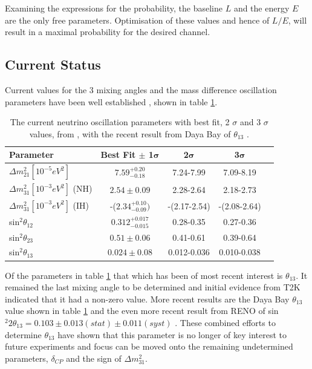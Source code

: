 Examining the expressions for the probability, the baseline $L$ and the energy $E$ are the only free parameters. Optimisation of these values and hence of $L/E$, will result in a maximal probability for the desired channel.

\subsection{Current Status}
Current values for the 3 mixing angles and the mass difference oscillation parameters have been well established \cite{oscParameters}\cite{DayaBaytheta13}, shown in table \ref{tab:osciParameterTable}.
\renewcommand{\arraystretch}{1.5}
\begin{table}[htpb]
\begin{center}
  \begin{tabular}{l*{3}{c}r}
  \hline
  \textbf{Parameter} & \textbf{Best Fit} $\boldsymbol{\pm}$ 1$\boldsymbol{\sigma}$ & \textbf{2}$\boldsymbol{\sigma}$ & \textbf{3}$\boldsymbol{\sigma}$ \\
    \hline
\hline
$\Delta m^{2}_{21} [10^{-5}eV^{2}]$ & $7.59^{+0.20}_{-0.18} $ & 7.24-7.99 & 7.09-8.19\\
$\Delta m^{2}_{31} [10^{-3}eV^{2}]$ (NH) & $2.54 \pm 0.09 $ & 2.28-2.64 & 2.18-2.73\\
$\Delta m^{2}_{31} [10^{-3}eV^{2}]$ (IH) & -($2.34^{+0.10}_{-0.09}) $ & -(2.17-2.54) & -(2.08-2.64)\\
sin$^{2}\theta_{12}$ & $0.312^{+0.017}_{-0.015} $ & 0.28-0.35 & 0.27-0.36\\
sin$^{2}\theta_{23}$ & $0.51 \pm 0.06 $ & 0.41-0.61 & 0.39-0.64\\
sin$^{2}\theta_{13}$ & $0.024 \pm 0.08 $  &  0.012-0.036 & 0.010-0.038\\
    \hline
  \end{tabular}
      \caption{The current neutrino oscillation parameters with best fit, 2 $\sigma$ and 3 $\sigma$ values, from \cite{oscParameters}, with the recent result from Daya Bay of $\theta_{13}$ \cite{DayaBaytheta13}.}
    \label{tab:osciParameterTable}
\end{center}
    \end{table}
\renewcommand{\arraystretch}{1.0}

Of the parameters in table \ref{tab:osciParameterTable} that which has been of most recent interest is $\theta_{13}$. It remained the last mixing angle to be determined and initial evidence from T2K \cite{T2Ktheta13} indicated that it had a non-zero value. More recent results are the Daya Bay $\theta_{13}$ value shown in table \ref{tab:osciParameterTable} and the even more recent result from RENO of sin$^{2}2\theta_{13} = 0.103 \pm 0.013(stat) \pm 0.011(syst)$ \cite{RENO}. These combined efforts to determine $\theta_{13}$ have shown that this parameter is no longer of key interest to future experiments and focus can be moved onto the remaining undetermined parameters, $\delta_{CP}$ and the sign of $\Delta m^{2}_{31}$.

